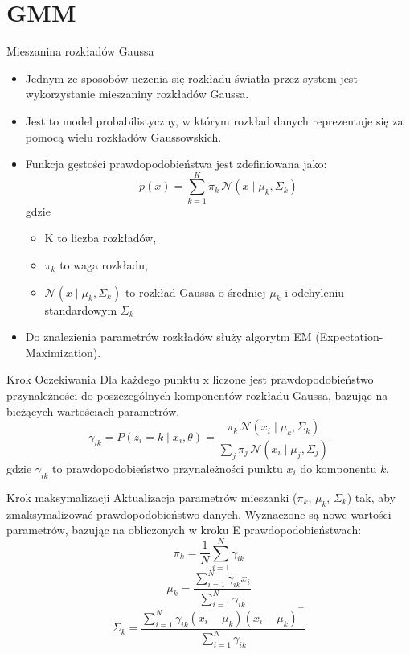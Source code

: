 \documentclass{beamer}
\begin{document}
\section{GMM}
\begin{frame}{Mieszanina rozkładów Gaussa}
\begin{itemize}
    \item Jednym ze sposobów uczenia się rozkładu światła przez system jest wykorzystanie mieszaniny rozkładów Gaussa.
    \item Jest to model probabilistyczny, w którym rozkład danych reprezentuje się za pomocą wielu rozkładów Gaussowskich.
    \item Funkcja gęstości prawdopodobieństwa jest zdefiniowana jako:
$$p(x) = \sum_{k=1}^{K} \pi_k \, \mathcal{N}(x \mid \mu_k, \Sigma_k)$$
gdzie
\begin{itemize}
    \item K to liczba rozkładów,
    \item $\pi_k$ to waga rozkładu,
    \item $\mathcal{N}(x \mid \mu_k, \Sigma_k)$ to rozkład Gaussa o średniej $\mu_k$ i odchyleniu standardowym $\Sigma_k$
\end{itemize}
\item Do znalezienia parametrów rozkładów służy algorytm EM (Expectation-Maximization).
\end{itemize}

\end{frame}

\begin{frame}{Krok Oczekiwania}
    Dla każdego punktu x liczone jest prawdopodobieństwo przynależności do poszczególnych komponentów rozkładu Gaussa, bazując na bieżących wartościach parametrów.
            \[
            \gamma_{ik} = P(z_i = k \mid x_i, \theta) = \frac{\pi_k \, \mathcal{N}(x_i \mid \mu_k, \Sigma_k)}{\sum_{j} \pi_j \, \mathcal{N}(x_i \mid \mu_j, \Sigma_j)}
            \]
            gdzie \( \gamma_{ik} \) to prawdopodobieństwo przynależności punktu \( x_i \) do komponentu \( k \).

\end{frame}

\begin{frame}{Krok maksymalizacji}
    Aktualizacja parametrów mieszanki (\( \pi_k \), \( \mu_k \), \( \Sigma_k \)) tak, aby zmaksymalizować prawdopodobieństwo danych. Wyznaczone są nowe wartości parametrów, bazując na obliczonych w kroku E prawdopodobieństwach:
            \[
            \pi_k = \frac{1}{N} \sum_{i=1}^N \gamma_{ik}
            \]
            \[
            \mu_k = \frac{\sum_{i=1}^N \gamma_{ik} x_i}{\sum_{i=1}^N \gamma_{ik}}
            \]
            \[
            \Sigma_k = \frac{\sum_{i=1}^N \gamma_{ik} (x_i - \mu_k)(x_i - \mu_k)^\top}{\sum_{i=1}^N \gamma_{ik}}
            \]
\end{frame}
\end{document}
